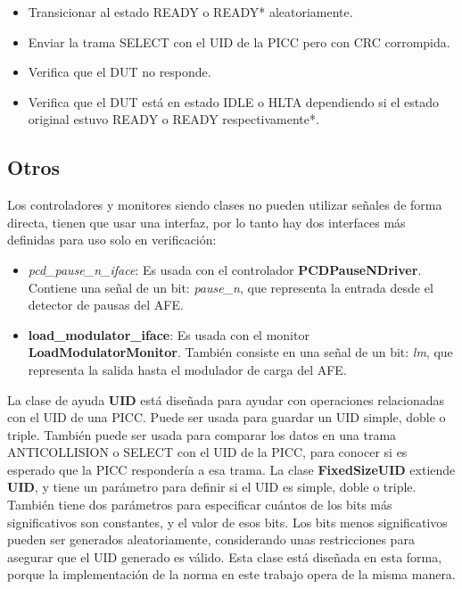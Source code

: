 \documentclass[a4paper, twoside, 11pt]{report}
\begin{document}
\begin{itemize}
  \item Transicionar al estado READY o READY* aleatoriamente.
  \item Enviar la trama SELECT con el UID de la PICC pero con CRC corrompida.
  \item Verifica que el DUT no responde.
  \item Verifica que el DUT está en estado IDLE o HLTA dependiendo si el estado original estuvo READY o READY respectivamente*.
\end{itemize}

\FloatBarrier
\subsection{Otros}

Los controladores y monitores siendo clases no pueden utilizar señales de forma directa, tienen que usar una interfaz, por lo tanto hay dos interfaces más definidas para uso solo en verificación:

\begin{itemize}
  \item \textit{pcd\_pause\_n\_iface}: Es usada con el controlador \textbf{PCDPauseNDriver}. Contiene una señal de un bit: \textit{pause\_n}, que representa la entrada desde el detector de pausas del AFE.
  \item \textbf{load\_modulator\_iface}: Es usada con el monitor \textbf{LoadModulatorMonitor}. También consiste en una señal de un bit: \textit{lm}, que representa la salida hasta el modulador de carga del AFE.
\end{itemize}

La clase de ayuda \textbf{UID} está diseñada para ayudar con operaciones relacionadas con el UID de una PICC. Puede ser usada para guardar un UID simple, doble o triple. También puede ser usada para comparar los datos en una trama ANTICOLLISION o SELECT con el UID de la PICC, para conocer si es esperado que la PICC respondería a esa trama. La clase \textbf{FixedSizeUID} extiende \textbf{UID}, y tiene un parámetro para definir si el UID es simple, doble o triple. También tiene dos parámetros para especificar cuántos de los bits más significativos son constantes, y el valor de esos bits. Los bits menos significativos pueden ser generados aleatoriamente, considerando unas restricciones para asegurar que el UID generado es válido. Esta clase está diseñada en esta forma, porque la implementación de la norma en este trabajo opera de la misma manera.
\end{document}
